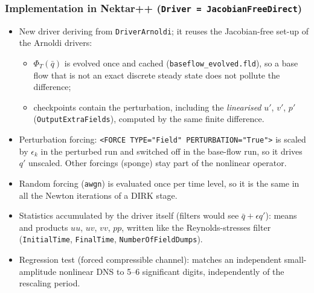 \documentclass[
  aspectratio=169,
  t,
  onlytextwidth,
  10pt,
]{beamer}
\newcommand{\qb}{\bar{q}}
\newcommand{\PhiT}{\Phi_T}
\begin{document}
\begin{frame}
	\frametitle{Implementation in Nektar++ (\texttt{Driver = JacobianFreeDirect})}
	\small
	\begin{itemize}
		\item New driver deriving from \texttt{DriverArnoldi}; it reuses the Jacobian-free set-up of the Arnoldi drivers:
		      \begin{itemize}\footnotesize
			      \item $\PhiT(\qb)$ is evolved once and cached (\texttt{baseflow\_evolved.fld}), so a base flow that is not an exact discrete steady state does not pollute the difference;
			      \item checkpoints contain the perturbation, including the \emph{linearised} $u'$, $v'$, $p'$ (\texttt{OutputExtraFields}), computed by the same finite difference.
		      \end{itemize}
		\item Perturbation forcing: \texttt{<FORCE TYPE="Field" PERTURBATION="True">} is scaled by $\epsilon_k$ in the perturbed run and switched off in the base-flow run, so it drives $q'$ unscaled. Other forcings (sponge) stay part of the nonlinear operator.
		\item Random forcing (\texttt{awgn}) is evaluated once per time level, so it is the same in all the Newton iterations of a DIRK stage.
		\item Statistics accumulated by the driver itself (filters would see $\qb + \epsilon q'$): means and products $uu$, $uv$, $vv$, $pp$, written like the Reynolds-stresses filter (\texttt{InitialTime}, \texttt{FinalTime}, \texttt{NumberOfFieldDumps}).
		\item Regression test (forced compressible channel): matches an independent small-amplitude nonlinear DNS to 5--6 significant digits, independently of the rescaling period.
	\end{itemize}
\end{frame}
\end{document}
